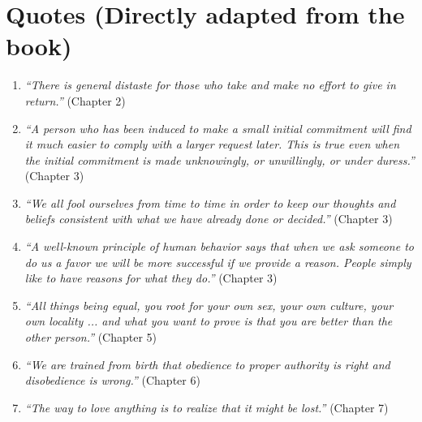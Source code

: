\section*{Quotes (Directly adapted from the book)}
\begin{enumerate}
    \item \emph{``There is general distaste for those who take and make no effort to give in return.''} (Chapter 2)
    \item \emph{``A person who has been induced to make a small initial commitment will find it much easier to comply with a larger request later. This is true even when the initial commitment is made unknowingly, or unwillingly, or under duress.''} (Chapter 3)
    \item \emph{``We all fool ourselves from time to time in order to keep our thoughts and beliefs consistent with what we have already done or decided.''} (Chapter 3)
    \item \emph{``A well-known principle of human behavior says that when we ask someone to do us a favor we will be more successful if we provide a reason. People simply like to have reasons for what they do.''} (Chapter 3)
    \item \emph{``All things being equal, you root for your own sex, your own culture, your own locality ... and what you want to prove is that you are better than the other person.''} (Chapter 5)
    \item \emph{``We are trained from birth that obedience to proper authority is right and disobedience is wrong.''} (Chapter 6)
    \item \emph{``The way to love anything is to realize that it might be lost.''} (Chapter 7)
\end{enumerate}